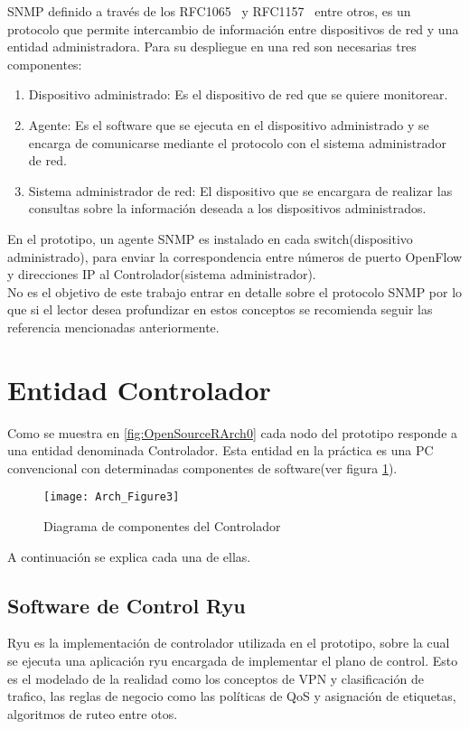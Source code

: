 SNMP definido a través de los RFC1065~\citep{rose1990structure} y RFC1157~\citep{case1989simple} entre otros, es un protocolo que permite intercambio de información entre dispositivos de red y una entidad administradora. Para su despliegue en una red son necesarias tres componentes: 

\begin{enumerate}

\item Dispositivo administrado: Es el dispositivo de red que se quiere monitorear.

\item Agente: Es el software que se ejecuta en el dispositivo administrado y se encarga de comunicarse mediante el protocolo con el sistema administrador de red.

\item Sistema administrador de red: El dispositivo que se encargara de realizar las consultas sobre la información deseada a los dispositivos administrados.

\end{enumerate}	

En el prototipo, un agente SNMP es instalado en cada switch(dispositivo administrado), para enviar la correspondencia entre números de puerto OpenFlow y direcciones IP al Controlador(sistema administrador).\\

No es el objetivo de este trabajo entrar en detalle sobre el protocolo SNMP por lo que si el lector desea profundizar en estos conceptos se recomienda seguir las referencia mencionadas anteriormente.

\section{Entidad Controlador}
Como se muestra en \ref{fig:OpenSourceRArch0} cada nodo del prototipo responde a una entidad denominada Controlador. Esta entidad en la pr\'actica es una PC convencional con determinadas componentes de software(ver figura \ref{fig:OpenSourceRArch3}).

\begin{figure}[htbp!] 
\centering    
\texttt{[image: Arch\_Figure3]}
\caption[OpenSourceRArch3]{Diagrama de componentes del Controlador}
\label{fig:OpenSourceRArch3}
\end{figure}

A continuación se explica cada una de ellas.

\subsection{Software de Control Ryu}
Ryu es la implementaci\'on de controlador utilizada en el prototipo, sobre la cual se ejecuta una aplicación ryu encargada de implementar el plano de control. Esto es el modelado de la realidad como los conceptos de VPN y clasificación de trafico, las reglas de negocio como las políticas de QoS y asignación de etiquetas, algoritmos de ruteo entre otos. 

